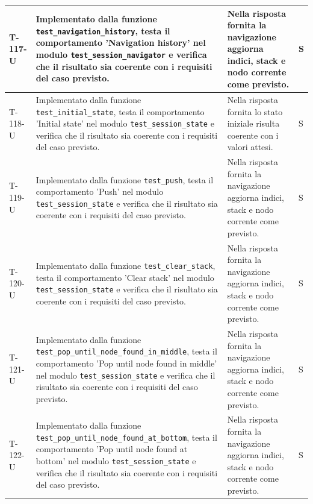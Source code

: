 \documentclass[a4paper,12pt]{article}
\begin{document}
{{\begin{longtable}{|>{\RaggedRight\arraybackslash}p{1.55cm}|>{\RaggedRight\arraybackslash}p{8.0cm}|>{\RaggedRight\arraybackslash}p{4.6cm}|>{\RaggedRight\arraybackslash}p{1.2cm}|}
        \hline
        T-117-U & Implementato dalla funzione \texttt{test\_\allowbreak navigation\_\allowbreak history}, testa il comportamento 'Navigation history' nel modulo \texttt{test\_\allowbreak session\_\allowbreak navigator} e verifica che il risultato sia coerente con i requisiti del caso previsto. & Nella risposta fornita la navigazione aggiorna indici, stack e nodo corrente come previsto. & S \\
        \hline
        T-118-U & Implementato dalla funzione \texttt{test\_\allowbreak initial\_\allowbreak state}, testa il comportamento 'Initial state' nel modulo \texttt{test\_\allowbreak session\_\allowbreak state} e verifica che il risultato sia coerente con i requisiti del caso previsto. & Nella risposta fornita lo stato iniziale risulta coerente con i valori attesi. & S \\
        \hline
        T-119-U & Implementato dalla funzione \texttt{test\_\allowbreak push}, testa il comportamento 'Push' nel modulo \texttt{test\_\allowbreak session\_\allowbreak state} e verifica che il risultato sia coerente con i requisiti del caso previsto. & Nella risposta fornita la navigazione aggiorna indici, stack e nodo corrente come previsto. & S \\
        \hline
        T-120-U & Implementato dalla funzione \texttt{test\_\allowbreak clear\_\allowbreak stack}, testa il comportamento 'Clear stack' nel modulo \texttt{test\_\allowbreak session\_\allowbreak state} e verifica che il risultato sia coerente con i requisiti del caso previsto. & Nella risposta fornita la navigazione aggiorna indici, stack e nodo corrente come previsto. & S \\
        \hline
        T-121-U & Implementato dalla funzione \texttt{test\_\allowbreak pop\_\allowbreak until\_\allowbreak node\_\allowbreak found\_\allowbreak in\_\allowbreak middle}, testa il comportamento 'Pop until node found in middle' nel modulo \texttt{test\_\allowbreak session\_\allowbreak state} e verifica che il risultato sia coerente con i requisiti del caso previsto. & Nella risposta fornita la navigazione aggiorna indici, stack e nodo corrente come previsto. & S \\
        \hline
        T-122-U & Implementato dalla funzione \texttt{test\_\allowbreak pop\_\allowbreak until\_\allowbreak node\_\allowbreak found\_\allowbreak at\_\allowbreak bottom}, testa il comportamento 'Pop until node found at bottom' nel modulo \texttt{test\_\allowbreak session\_\allowbreak state} e verifica che il risultato sia coerente con i requisiti del caso previsto. & Nella risposta fornita la navigazione aggiorna indici, stack e nodo corrente come previsto. & S \\

\end{longtable}}}
\end{document}
